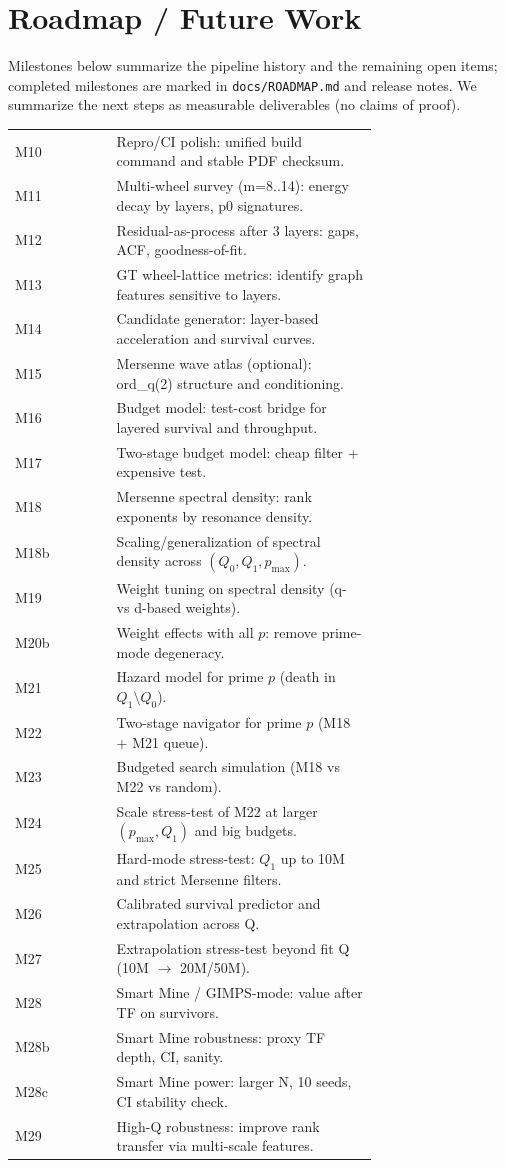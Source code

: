 \documentclass[11pt]{article}
\begin{document}
\appendix
\renewcommand{\thesection}{\AlphAlph{\value{section}}}
\renewcommand{\theHsection}{\AlphAlph{\value{section}}}
\section{Roadmap / Future Work}
Milestones below summarize the pipeline history and the remaining open items; completed milestones are marked in \texttt{docs/ROADMAP.md} and release notes. We summarize the
next steps as measurable deliverables (no claims of proof).

\begin{tabular}{lp{0.72\linewidth}}
\hline
M10 & Repro/CI polish: unified build command and stable PDF checksum. \\
M11 & Multi-wheel survey (m=8..14): energy decay by layers, p0 signatures. \\
M12 & Residual-as-process after 3 layers: gaps, ACF, goodness-of-fit. \\
M13 & GT wheel-lattice metrics: identify graph features sensitive to layers. \\
M14 & Candidate generator: layer-based acceleration and survival curves. \\
M15 & Mersenne wave atlas (optional): ord\_q(2) structure and conditioning. \\
M16 & Budget model: test-cost bridge for layered survival and throughput. \\
M17 & Two-stage budget model: cheap filter + expensive test. \\
M18 & Mersenne spectral density: rank exponents by resonance density. \\
M18b & Scaling/generalization of spectral density across $(Q_0,Q_1,p_{\max})$. \\
M19 & Weight tuning on spectral density (q- vs d-based weights). \\
M20b & Weight effects with all $p$: remove prime-mode degeneracy. \\
M21 & Hazard model for prime $p$ (death in $Q_1\setminus Q_0$). \\
M22 & Two-stage navigator for prime $p$ (M18 + M21 queue). \\
M23 & Budgeted search simulation (M18 vs M22 vs random). \\
M24 & Scale stress-test of M22 at larger $(p_{\max},Q_1)$ and big budgets. \\
M25 & Hard-mode stress-test: $Q_1$ up to 10M and strict Mersenne filters. \\
M26 & Calibrated survival predictor and extrapolation across Q. \\
M27 & Extrapolation stress-test beyond fit Q (10M $\rightarrow$ 20M/50M). \\
M28 & Smart Mine / GIMPS-mode: value after TF on survivors. \\
M28b & Smart Mine robustness: proxy TF depth, CI, sanity. \\
M28c & Smart Mine power: larger N, 10 seeds, CI stability check. \\
M29 & High-Q robustness: improve rank transfer via multi-scale features. \\
\hline
\end{tabular}
\end{document}

